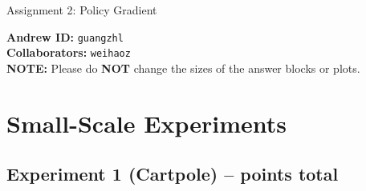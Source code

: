 \documentclass{article}
\begin{document}

\begin{centering}
    {\Large Assignment 2: Policy Gradient} \\
    \vspace{.25cm}
\end{centering}
\vspace{0.25cm}

\textbf{Andrew ID:} \texttt{guangzhl} \\
\textbf{Collaborators:} \texttt{weihaoz}\\ 
\textbf{NOTE:} Please do \textbf{NOT} change the sizes of the answer blocks or plots.

\setcounter{section}{4}
\section{Small-Scale Experiments}

\subsection{Experiment 1 (Cartpole) --  points total\rbrack}
\end{document}
